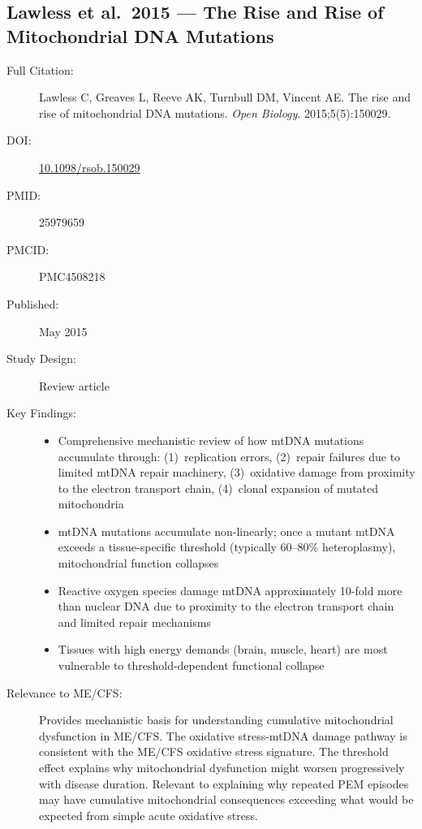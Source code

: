 \subsection{Lawless et al.\ 2015 --- The Rise and Rise of Mitochondrial DNA Mutations}

\begin{description}
    \item[Full Citation:] Lawless C, Greaves L, Reeve AK, Turnbull DM, Vincent AE. The rise and rise of mitochondrial DNA mutations. \textit{Open Biology}. 2015;5(5):150029.
    \item[DOI:] \href{https://doi.org/10.1098/rsob.150029}{10.1098/rsob.150029}
    \item[PMID:] 25979659
    \item[PMCID:] PMC4508218
    \item[Published:] May 2015
    \item[Study Design:] Review article
    \item[Key Findings:]
    \begin{itemize}
        \item Comprehensive mechanistic review of how mtDNA mutations accumulate through: (1)~replication errors, (2)~repair failures due to limited mtDNA repair machinery, (3)~oxidative damage from proximity to the electron transport chain, (4)~clonal expansion of mutated mitochondria
        \item mtDNA mutations accumulate non-linearly; once a mutant mtDNA exceeds a tissue-specific threshold (typically 60--80\% heteroplasmy), mitochondrial function collapses
        \item Reactive oxygen species damage mtDNA approximately 10-fold more than nuclear DNA due to proximity to the electron transport chain and limited repair mechanisms
        \item Tissues with high energy demands (brain, muscle, heart) are most vulnerable to threshold-dependent functional collapse
    \end{itemize}
    \item[Relevance to ME/CFS:] Provides mechanistic basis for understanding cumulative mitochondrial dysfunction in ME/CFS. The oxidative stress-mtDNA damage pathway is consistent with the ME/CFS oxidative stress signature. The threshold effect explains why mitochondrial dysfunction might worsen progressively with disease duration. Relevant to explaining why repeated PEM episodes may have cumulative mitochondrial consequences exceeding what would be expected from simple acute oxidative stress.

\end{description}
